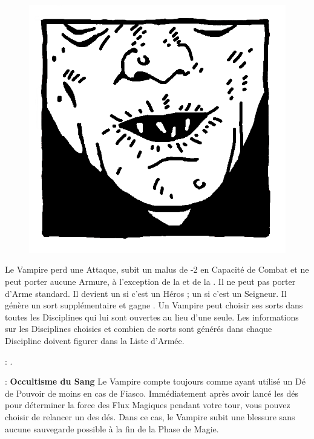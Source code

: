 \begin{figure}
\centering
\includegraphics[width=\logosize]{logos/logo_nosferatu.png}
\end{figure}
Le Vampire perd une Attaque, subit un malus de -2 en Capacité de Combat et ne peut porter aucune Armure, à l'exception de la \mountsprotection{} et de la \innatedefence{}. Il ne peut pas porter d'Arme standard. Il devient un  si c'est un Héros ; un  si c'est un Seigneur. Il génère un sort supplémentaire et gagne \awaken{\skeletons{}, \zombies{}}. Un Vampire \nosferatu{} peut choisir ses sorts dans toutes les Disciplines qui lui sont ouvertes au lieu d'une seule. Les informations sur les Disciplines choisies et combien de sorts sont générés dans chaque Discipline doivent figurer dans la Liste d'Armée.

\vspace{0.5cm}
\bloodties{} : \textbf{\wraiths{}}.

\vspace{0.5cm}
\ancientbloodpower{} : \textbf{Occultisme du Sang}\dotfill{}\newline%
Le Vampire compte toujours comme ayant utilisé un Dé de Pouvoir de moins en cas de Fiasco. Immédiatement après avoir lancé les dés pour déterminer la force des Flux Magiques pendant votre tour, vous pouvez choisir de relancer un des dés. Dans ce cas, le Vampire subit une blessure sans aucune sauvegarde possible à la fin de la Phase de Magie.

